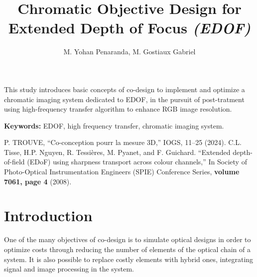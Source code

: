 \documentclass[10pt,letterpaper]{article}
\begin{document}
\title{Chromatic Objective Design for Extended Depth of Focus \textit{(EDOF)}}

\author{M. Yohan Penaranda, M. Gostiaux Gabriel}

\address{M. Gabriel Gostiaux, Master of Science student, Institute of Optics, \\ Palaiseau, 91 120, France}




\begin{abstract*}
This study introduces basic concepts of co-design to implement and optimize a chromatic imaging system dedicated to EDOF, in the pursuit of post-tratment using high-frequency transfer algorithm to enhance RGB image resolution.
\hfill \break

\textbf{Keywords:} EDOF, high frequency transfer, chromatic imaging system.

\end{abstract*}


\begin{thebibliography}{99}

 P. TROUVE, ``Co-conception pourr la mesure 3D,'' IOGS, 11--25 (2024).
 C.L. Tisse, H.P. Nguyen, R. Tessières, M. Pyanet, and F. Guichard. ``Extended
depth-of-field (EDoF) using sharpness transport across colour channels,'' In
Society of Photo-Optical Instrumentation Engineers (SPIE) Conference Series, {\bf volume 7061, page 4} (2008).

\end{thebibliography}

\section{Introduction}
One of the many objectives of co-design is to simulate optical designs in order to optimize costs through reducing the number of elements of the optical chain of a system. It is also possible to replace costly elements with hybrid ones, integrating signal and image processing in the system.
\end{document}
